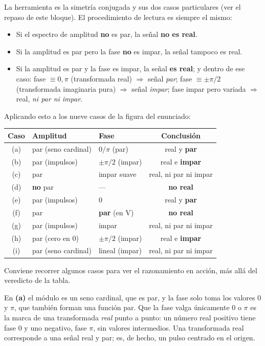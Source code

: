 \documentclass[10pt,a4paper]{article}
\begin{document}
	La herramienta es la simetría conjugada y sus dos casos particulares (ver el repaso de este bloque). El procedimiento de lectura es siempre el mismo:
	\begin{itemize}[topsep=2pt, itemsep=1pt]
		\item Si el espectro de amplitud \textbf{no} es par, la señal \textbf{no es real}.
		\item Si la amplitud es par pero la fase \textbf{no} es impar, la señal tampoco es real.
		\item Si la amplitud es par y la fase es impar, la señal \textbf{es real}; y dentro de ese caso:
		fase $\equiv 0,\pi$ (transformada real) $\Rightarrow$ señal \emph{par};
		fase $\equiv \pm\pi/2$ (transformada imaginaria pura) $\Rightarrow$ señal \emph{impar};
		fase impar pero variada $\Rightarrow$ real, \emph{ni par ni impar}.
	\end{itemize}
	Aplicando esto a los nueve casos de la figura del enunciado:

	\begin{center}
		\begin{tabular}{cllc}
			\toprule
			Caso & Amplitud & Fase & Conclusión \\
			\midrule
			(a) & par (seno cardinal) & $0/\pi$ (par) & real y \textbf{par} \\
			(b) & par (impulsos) & $\pm\pi/2$ (impar) & real e \textbf{impar} \\
			(c) & par & impar suave & real, ni par ni impar \\
			(d) & \textbf{no} par & --- & \textbf{no real} \\
			(e) & par (impulsos) & $0$ & real y \textbf{par} \\
			(f) & par & \textbf{par} (en V) & \textbf{no real} \\
			(g) & par (impulsos) & impar & real, ni par ni impar \\
			(h) & par (cero en $0$) & $\pm\pi/2$ (impar) & real e \textbf{impar} \\
			(i) & par (seno cardinal) & lineal (impar) & real, ni par ni impar \\
			\bottomrule
		\end{tabular}
	\end{center}

	Conviene recorrer algunos casos para ver el razonamiento en acción, más allá del veredicto de la tabla.

	En \textbf{(a)} el módulo es un seno cardinal, que es par, y la fase solo toma los valores $0$ y $\pi$, que también forman una función par. Que la fase valga únicamente $0$ o $\pi$ es la marca de una transformada \emph{real} punto a punto: un número real positivo tiene fase $0$ y uno negativo, fase $\pi$, sin valores intermedios. Una transformada real corresponde a una señal real y par; es, de hecho, un pulso centrado en el origen.
\end{document}
